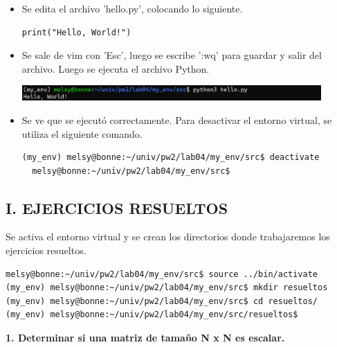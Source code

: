 \documentclass{article}
\begin{document}
\begin{itemize}
  \item Se edita el archivo 'hello.py', colocando lo siguiente.

  \begin{lstlisting}[style=python]
  print("Hello, World!")
  \end{lstlisting}
  
  \item Se sale de vim con 'Esc', luego se escribe ':wq' para guardar y salir del archivo. Luego se ejecuta el archivo Python.

  \begin{minipage}{\linewidth}
    \centering
    \includegraphics[width=0.9\textwidth]{imagenes/hello.png}
  \end{minipage}

  
  \item Se ve que se ejecutó correctamente. Para desactivar el entorno virtual, se utiliza el siguiente comando.

  \begin{lstlisting}[style=shell]
  (my_env) melsy@bonne:~/univ/pw2/lab04/my_env/src$ deactivate
  melsy@bonne:~/univ/pw2/lab04/my_env/src$
  \end{lstlisting}
\end{itemize}

\pagebreak

\subsection*{I. EJERCICIOS RESUELTOS}

\vspace{\baselineskip}

Se activa el entorno virtual y se crean los directorios donde trabajaremos los ejercicios resueltos.

\begin{lstlisting}[style=shell]
melsy@bonne:~/univ/pw2/lab04/my_env/src$ source ../bin/activate
(my_env) melsy@bonne:~/univ/pw2/lab04/my_env/src$ mkdir resueltos
(my_env) melsy@bonne:~/univ/pw2/lab04/my_env/src$ cd resueltos/
(my_env) melsy@bonne:~/univ/pw2/lab04/my_env/src/resueltos$
\end{lstlisting} 

\vspace{2\baselineskip}

\textbf{1. Determinar si una matriz de tamaño N x N es escalar.}
\end{document}
